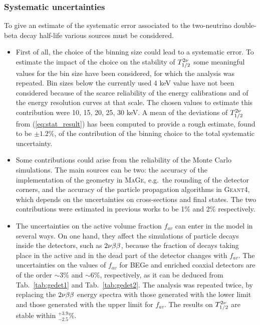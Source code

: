 \subsubsection*{Systematic uncertainties}
To give an estimate of the systematic error associated to the two-neutrino double-beta decay half-life various sources must be considered.
\begin{itemize}
	\item First of all, the choice of the binning size could lead to a systematic error. To estimate the impact of the choice on the stability of $T_{1/2}^{2\nu}$ some meaningful values for the bin size have been considered, for which the analysis was repeated. Bin sizes below the currently used 4 keV value have not been considered because of the scarce reliability of the energy calibrations and of the energy resolution curves at that scale. The chosen values to estimate this contribution were 10, 15, 20, 25, 30 keV. A mean of the deviations of $T_{1/2}^{2\nu}$ from (\ref{eq:stat_result}) has been computed to provide a rough estimate, found to be $\pm1.2\%$, of the contribution of the binning choice to the total systematic uncertainty.
	\item Some contributions could arise from the reliability of the Monte Carlo simulations. The main sources can be two: the accuracy of the implementation of the {\gerda} geometry in \textsc{MaGe}, e.g.~the rounding of the detector corners, and the accuracy of the particle propagation algorithms in \textsc{Geant4}, which depends on the uncertainties on cross-sections and final states. The two contributions were estimated in previous works to be 1\% \cite{gerda2nbb} and 2\% \cite{geant4sys1, geant4sys2, geant4sys3} respectively.
	\item The uncertainties on the active volume fraction $f_{av}$ can enter in the model in several ways. On one hand, they affect the simulations of particle decays inside the detectors, such as $2\nu\beta\beta$, because the fraction of decays taking place in the active and in the dead part of the detector changes with $f_{av}$. The uncertainties on the values of $f_{av}$ for BEGe and enriched coaxial detectors are of the order $\sim$3\% and $\sim$6\%, respectively, as it can be deduced from Tab.~\ref{tab:gedet1} and Tab.~\ref{tab:gedet2}. The analysis was repeated twice, by replacing the $2\nu\beta\beta$ energy spectra with those generated with the lower limit and those generated with the upper limit for $f_{av}$. The results on $T_{1/2}^{2\nu}$ are stable within $^{+3.9}_{-2.5}\%$.


\end{itemize}
